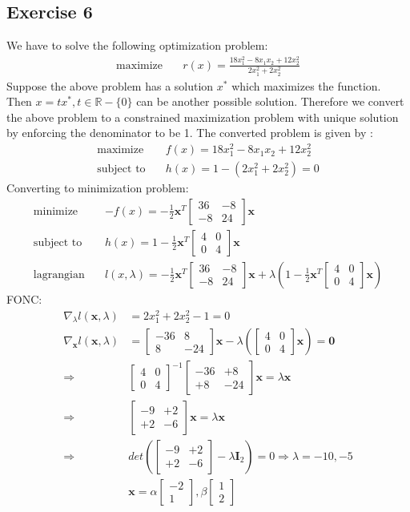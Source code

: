 \documentclass[a4paper,11pt]{article}
\newcommand{\V}[1]{\boldsymbol{#1}}
\newcommand{\mat}[1]{\begin{bmatrix}#1\end{bmatrix}}
\begin{document}
\subsection*{Exercise 6} 
We have to solve the following optimization problem:
\begin{align*}
	\text{maximize} \quad& r(x) = \frac{18x_1^2 - 8x_1x_2 +12x_2^2}{2x_1^2 + 2x_2^2}
\end{align*}
Suppose the above problem has a solution $x^*$ which maximizes the function. Then $x = tx^*, t\in \mathbb{R}-\{0\}$ can be another possible solution. Therefore we convert the above problem to a constrained maximization problem with unique solution by enforcing the denominator to be 1. The converted problem is given by :
\begin{align*}
 \text{maximize} \quad& f(x) = 18x_1^2 - 8x_1x_2 +12x_2^2\\
	\text{subject to} \quad& h(x)= 1 - (2x_1^2 + 2x_2^2) = 0
\end{align*}
Converting to minimization problem:
\begin{align*}
 \text{minimize} \quad& -f(x) = -\frac{1}{2}\V{x}^T\mat{36& -8\\-8& 24}\V{x}\\
 \text{subject to} \quad& h(x)= 1 - \frac{1}{2}\V{x}^T\mat{4&0\\0&4}\V{x}\\
 \text{lagrangian}\quad& l(x,\lambda) = -\frac{1}{2}\V{x}^T\mat{36& -8\\-8& 24}\V{x} + \lambda(1 - \frac{1}{2}\V{x}^T\mat{4&0\\0&4}\V{x})
\end{align*}
FONC:
\begin{align*}
 \nabla_{\lambda} l(\V{x},\lambda)&= 2x_1^2 + 2x_2^2-1 = 0\\
 \nabla_{\V{x}} l(\V{x},\lambda) &= 
 \mat{-36& 8\\8& -24}\V{x} - \lambda(\mat{4&0\\0&4}\V{x})=\V{0}\\
 \Rightarrow& \mat{4&0\\0&4}^{-1}\mat{-36& +8\\+8& -24}\V{x} = \lambda\V{x}\\
 \Rightarrow& \mat{-9& +2\\+2& -6}\V{x} = \lambda\V{x}\\
 \Rightarrow& det(\mat{-9& +2\\+2& -6}-\lambda \V{I}_2) = 0
 \Rightarrow \lambda = -10,-5\\ 
 & \V{x} = \alpha\mat{-2\\1}, \beta\mat{1\\2}\\
\end{align*}
\end{document}

